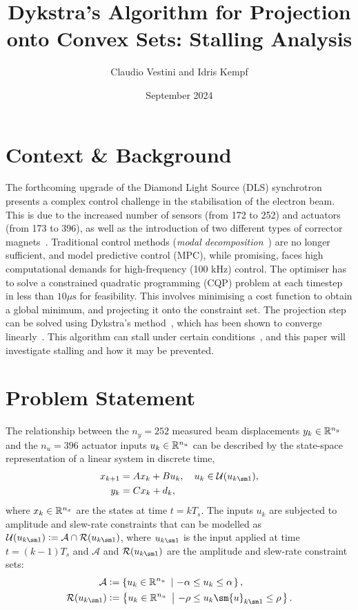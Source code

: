 \documentclass[hidelinks]{article}
\title{Dykstra's Algorithm for Projection onto Convex Sets: Stalling Analysis}
\author{Claudio Vestini and Idris Kempf}
\date{September 2024}
\begin{document}
\maketitle
%
\section{Context \& Background}
The forthcoming upgrade of the Diamond Light Source (DLS) synchrotron presents a complex control challenge in the stabilisation of the electron beam. This is due to the increased number of sensors (from 172 to 252) and actuators (from 173 to 396), as well as the introduction of two different types of corrector magnets~\cite{MPCDLSII}. Traditional control methods (\textit{modal decomposition}~\cite{HEATH}) are no longer sufficient, and model predictive control (MPC), while promising, faces high computational demands for high-frequency (100 kHz) control. The optimiser has to solve a constrained quadratic programming (CQP) problem at each timestep in less than $10\mu\!\text{s}$ for feasibility. This involves minimising a cost function to obtain a global minimum, and projecting it onto the constraint set. The projection step can be solved using Dykstra's method~\cite{DYKSTRA}, which has been shown to converge linearly~\cite{DYKSTRAPOLY2}. 
This algorithm can stall under certain conditions~\cite{DYKSTRASTALLING}, and this paper will investigate stalling and how it may be prevented.
%
\section{Problem Statement}
The relationship between the $n_y = 252$ measured beam displacements ${y}_k \in \mathbb{R}^{n_y}$ and the $n_u = 396$ actuator inputs ${u}_k \in \mathbb{R}^{n_u}$ can be described by the state-space representation of a linear system in discrete time,
\begin{subequations}
\begin{align}\label{eq:statespace}
{x}_{k+1}&={A}{x}_{k}+{B}{u}_{k},\quad u_k\in\mathcal{U}({u}_{k\sm 1}),\\
{y}_{k}&={C}{x}_{k}+{d}_{k},
\end{align}
\end{subequations}
where ${x}_k \in \mathbb{R}^{n_x}$ are the states at time $t=k T_s$. The inputs ${u_k}$ are subjected to amplitude and slew-rate constraints that can be modelled as $\mathcal{U}({u}_{k\sm 1})\eqdef\mathcal{A}\cap\mathcal{R}({u}_{k\sm 1})$, where ${u}_{k\sm 1}$ is the input applied at time $t=(k-1) T_s$ and $\mathcal{A}$ and $\mathcal{R}({u}_{k\sm 1})$ are the amplitude and slew-rate constraint sets:
\begin{subequations}\label{eq:constraints}
\begin{align}
\mathcal{A}&\eqdef\set{{u}_{k}\in\R^{n_u}}{-\alpha \leq {u}_{k} \leq \alpha},\\
\mathcal{R}({u}_{k\sm 1})&\eqdef\set{{u}_{k}\in\R^{n_u}}{-\rho \leq {u}_{k}\sm {u}_{k\sm 1} \leq \rho}.
\end{align}
\end{subequations}
\end{document}
